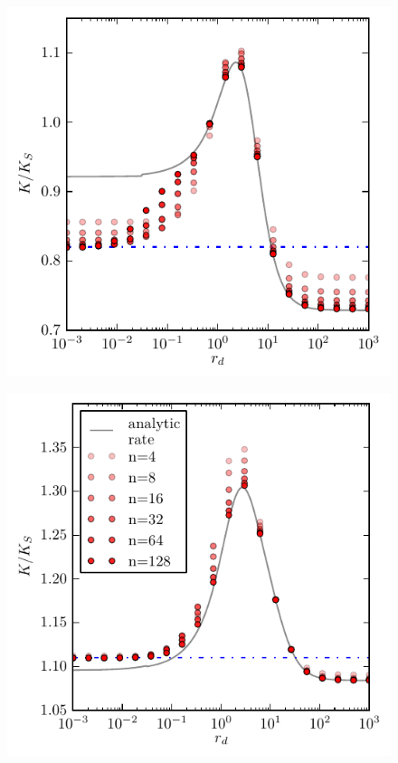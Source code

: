 \begin{minipage}[t]{.5 \textwidth}
    \begin{figure}[H]
        \includegraphics[width = 1 \textwidth]{plots/rb_cs.pdf}
    \end{figure}
\end{minipage}\begin{minipage}[t]{.5 \textwidth}
    \begin{figure}[H]
        \includegraphics[width = 1 \textwidth]{plots/ab_cs.pdf}
    \end{figure}
\end{minipage}

